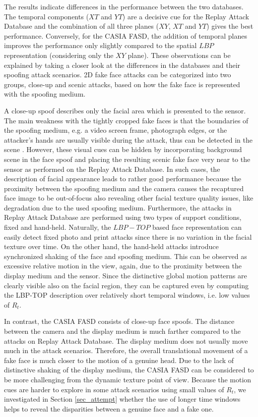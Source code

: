 The results indicate differences in the performance between the two databases. The temporal components ($XT$ and $YT$) are a decisive cue for the Replay Attack Database and the combination of all three planes ($XY$, $XT$ and $YT$) gives the best performance. Conversely, for the CASIA FASD, the addition of temporal planes improves the performance only slightly compared to the spatial $LBP$ representation (considering only the $XY$ plane). These observations can be explained by taking a closer look at the differences in the databases and their spoofing attack scenarios. 2D fake face attacks can be categorized into two groups, close-up and scenic attacks, based on how the fake face is represented with the spoofing medium.

A close-up spoof describes only the facial area which is presented to the sensor. The main weakness with the tightly cropped fake faces is that the boundaries of the spoofing medium, e.g. a video screen frame, photograph edges, or the attacker's hands are usually visible during the attack, thus can be detected in the scene \cite{JukkaLBP2012}. However, these visual cues can be hidden by incorporating background scene in the face spoof and placing the resulting scenic fake face very near to the sensor as performed on the Replay Attack Database. In such cases, the description of facial appearance leads to rather good performance because the proximity between the spoofing medium and the camera causes the recaptured face image to be out-of-focus also revealing other facial texture quality issues, like degradation due to the used spoofing medium. Furthermore, the attacks in Replay Attack Database are performed using two types of support conditions, fixed and hand-held. Naturally, the $LBP-TOP$ based face representation can easily detect fixed photo and print attacks since there is no variation in the facial texture over time. On the other hand, the hand-held attacks introduce synchronized shaking of the face and spoofing medium. This can be observed as excessive relative motion in the view, again, due to the proximity between the display medium and the sensor. Since the distinctive global motion patterns are clearly visible also on the facial region, they can be captured even by computing the LBP-TOP description over relatively short temporal windows, i.e. low values of $R_t$.

In contrast, the CASIA FASD consists of close-up face spoofs. The distance between the camera and the display medium is much farther compared to the attacks on Replay Attack Database. The display medium does not usually move much in the attack scenarios. Therefore, the overall translational movement of a fake face is much closer to the motion of a genuine head. Due to the lack of distinctive shaking of the display medium, the CASIA FASD can be considered to be more challenging from the dynamic texture point of view. Because the motion cues are harder to explore in some attack scenarios using small values of $R_t$, we investigated in Section \ref{sec_attempt} whether the use of longer time windows helps to reveal the disparities between a genuine face and a fake one.


